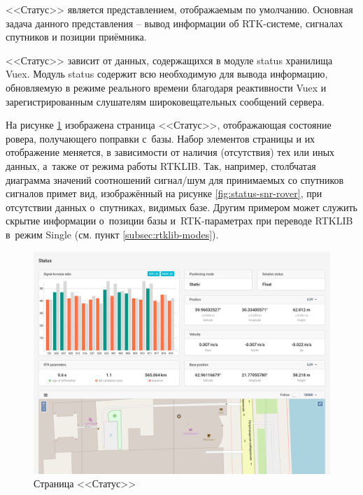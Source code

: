 <<Статус>> является представлением, отображаемым по умолчанию. Основная задача данного представления -- вывод информации об RTK-системе, сигналах спутников и позиции приёмника.

<<Статус>> зависит от данных, содержащихся в модуле status хранилища Vuex. Модуль status содержит всю необходимую для вывода информацию, обновляемую в режиме реального времени благодаря реактивности Vuex и зарегистрированным слушателям широковещательных сообщений сервера.

На рисунке \ref{fig:status-detailed} изображена страница <<Статус>>, отображающая состояние ровера, получающего поправки с~базы. Набор элементов страницы и их отображение меняется, в зависимости от наличия (отсутствия) тех или иных данных, а~также от режима работы RTKLIB. Так, например, столбчатая диаграмма значений соотношений сигнал/шум для принимаемых со спутников сигналов примет вид, изображённый на рисунке \ref{fig:status-snr-rover}, при отсутствии данных о~спутниках, видимых базе. Другим примером может служить скрытие информации о~позиции базы и~RTK-параметрах при переводе RTKLIB в~режим Single (см. пункт \ref{subsec:rtklib-modes}).

\begin{figure}[h!]
  \centering
  \setlength{\fboxsep}{5pt}
  \includegraphics[width=.9\textwidth]{img/reachview/status_content_laptop}
  \vspace*{6pt}
  \caption{Страница <<Статус>>}
  \label{fig:status-detailed}
\end{figure}


